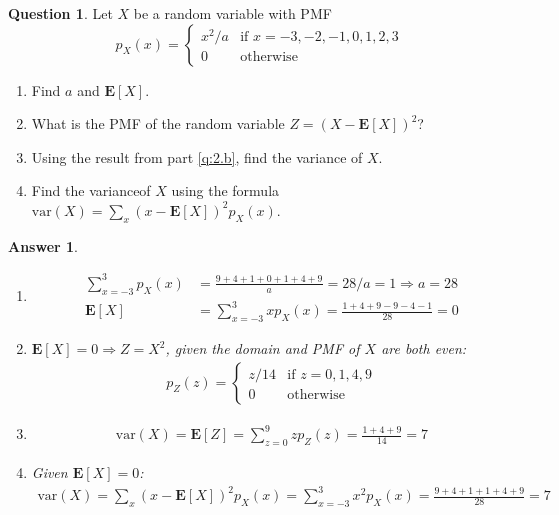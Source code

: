 \documentclass[utf8]{article}
\theoremstyle{definition}%
\newtheorem{question}{Question} %
\theoremstyle{plain}%
\newtheorem{answer}{Answer} %
\begin{document}
\begin{question}
    Let $X$ be a random variable with PMF
    \begin{equation}
        p_X(x) = 
        \begin{cases}
            x^2/a & \text{if } x = -3,-2,-1,0,1,2,3 \\
            0 & \text{otherwise}
        \end{cases}
    \end{equation}
    \begin{enumerate}[label=(\alph*)]
        \item Find $a$ and $\mathbf{E}[X]$.
        \item \label{q:2.b} What is the PMF of the random variable $Z = (X - \mathbf{E}[X])^2$?
        \item Using the result from part \ref{q:2.b}, find the variance of $X$.
        \item Find the varianceof $X$ using the formula $\text{var}(X) = \sum_x (x - \mathbf{E}[X])^2 p_X(x)$.
    \end{enumerate}
\end{question}
\begin{answer} ~
    \begin{enumerate}[label=(\alph*)]
        \item \begin{align}
            \sum_{x=-3}^{3} p_X(x) &= \frac{9+4+1+0+1+4+9}{a} = 28/a = 1 \Rightarrow a = 28 \\
            \mathbf{E}[X] &= \sum_{x=-3}^{3} x p_X(x) = \frac{1+4+9-9-4-1}{28} = 0
        \end{align}
        \item $\mathbf{E}[X] = 0 \Rightarrow Z = X^2$, given the domain and PMF of $X$ are both even:
        \begin{align}
            p_{Z}(z) = 
            \begin{cases}
                z/14 & \text{if } z = 0,1,4,9 \\
                0 & \text{otherwise}
            \end{cases}
        \end{align}
        \item \begin{align}
            \text{var}(X) = \mathbf{E}[Z] = \sum_{z=0}^{9} z p_{Z}(z) = \frac{1+4+9}{14} = 7
        \end{align}
        \item Given $\mathbf{E}[X] = 0$:
        \begin{align}
            \text{var}(X) = \sum_x (x - \mathbf{E}[X])^2 p_X(x) = \sum_{x=-3}^{3} x^2 p_X(x) = \frac{9+4+1+1+4+9}{28} = 7
        \end{align}
    \end{enumerate}
\end{answer}
\end{document}
